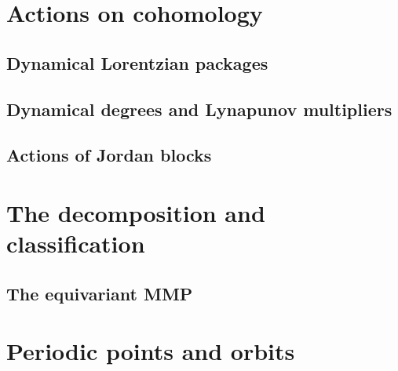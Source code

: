 \documentclass[sectionlevel=book,status=draft]{noteformyself}
\begin{document}
    \chapter[
      status=draft,
      tag=000,
      label=\labelNFM{chap:actions-on-cohomology}
    ]{Actions on cohomology}
        \section[
          status=draft,
          tag=00000,
          label=\labelNFM{sec:actions-on-cohomology:dynamical-lorentzian-packages}
        ]{Dynamical Lorentzian packages}
        
        \section[
          status=draft,
          tag=00000,
          label=\labelNFM{sec:actions-on-cohomology:dynamical-degrees-and-lynapunov-multipliers}
        ]{Dynamical degrees and Lynapunov multipliers}
        
        \section[
          status=draft,
          tag=00000,
          label=\labelNFM{sec:actions-on-cohomology:actions-of-jordan-blocks}
        ]{Actions of Jordan blocks}
        

    \chapter[
      status=draft,
      tag=000,
      label=\labelNFM{chap:the-decomposition-and-classification}
    ]{The decomposition and classification}
        \section[
          status=draft,
          tag=00000,
          label=\labelNFM{sec:the-decomposition-and-classification:the-equivariant-mmp}
        ]{The equivariant MMP}
        

    \chapter[
      status=draft,
      tag=000,
      label=\labelNFM{chap:periodic-points-and-orbits}
    ]{Periodic points and orbits}
\end{document}
